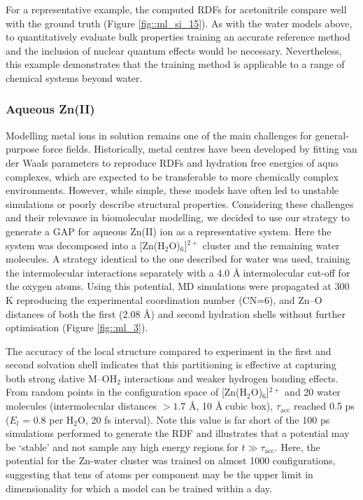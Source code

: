 \documentclass[../../main.tex]{subfiles}
\newcommand{\taua}{$\tau_\text{acc}$ }
\begin{document}
For a representative example, the computed RDFs for acetonitrile compare well with the ground truth (Figure \ref{fig::ml_si_15}). As with the water models above, to quantitatively evaluate bulk properties training an accurate reference method and the inclusion of nuclear quantum effects would be necessary.\cite{Veit2019, Cheng2019} Nevertheless, this example demonstrates that the training method is applicable to a range of chemical systems beyond water. 

\subsubsection{Aqueous Zn(II)}

Modelling metal ions in solution remains one of the main challenges for general-purpose force fields.\cite{Li2017chemrev} Historically, metal centres have been developed by fitting van der Waals parameters to reproduce RDFs and hydration free energies of aquo complexes, which are expected to be transferable to more chemically complex environments. However, while simple, these models have often led to unstable simulations or poorly describe structural properties.\cite{Li2017chemrev} Considering these challenges and their relevance in biomolecular modelling, we decided to use our strategy to generate a GAP for aqueous Zn(II) ion as a representative system. Here the system was decomposed into a [Zn(H${}_2$O)${}_6$]${}^{2+}$ cluster and the remaining water molecules. A strategy identical to the one described for water was used, training the intermolecular interactions separately with a 4.0 \AA$\;$intermolecular cut-off for the oxygen atoms. Using this potential, MD simulations were propagated at 300 K reproducing the experimental\cite{Ohtaki1993} coordination number (CN=6), and Zn--O distances of both the first (2.08 \AA) and second hydration shells without further optimisation (Figure \ref{fig::ml_3}).

The accuracy of the local structure compared to experiment in the first and second solvation shell indicates that this partitioning is effective at capturing both strong dative M–OH${}_2$ interactions and weaker hydrogen bonding effects. From random points in the configuration space of [Zn(H${}_2$O)${}_6$]${}^{2+}$ and 20 water molecules (intermolecular distances $> 1.7$ \AA, 10 \AA$\;$cubic box), \taua reached 0.5 ps ($E_l$ = 0.8 \kcalx per H${}_2$O, 20 fs interval). Note this value is far short of the 100 ps simulations performed to generate the RDF and illustrates that a potential may be ‘stable’ and not sample any high energy regions for $t \gg \tau_\text{acc}$. Here, the potential for the Zn-water cluster was trained on almost 1000 configurations, suggesting that tens of atoms per component may be the upper limit in dimensionality for which a model can be trained within a day.
\end{document}
